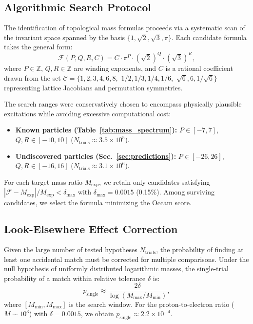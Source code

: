\documentclass[onecolumn,aps,prd,superscriptaddress,nofootinbib,amsmath,amssymb]{revtex4-2}
\begin{document}
\subsection{Algorithmic Search Protocol}
\label{subsec:search_protocol}

The identification of topological mass formulas proceeds via a systematic scan of the invariant space spanned by the basis $\{1, \sqrt{2}, \sqrt{3}, \pi\}$. Each candidate formula takes the general form:
\begin{equation}
    \mathcal{F}(P,Q,R,C) = C \cdot \pi^{P} \cdot (\sqrt{2})^{Q} \cdot (\sqrt{3})^{R},
    \label{eq:general_formula}
\end{equation}
where $P \in \mathbb{Z}$, $Q,R \in \mathbb{Z}$ are winding exponents, and $C$ is a rational coefficient drawn from the set $\mathcal{C} = \{1, 2, 3, 4, 6, 8,$ $1/2, 1/3, 1/4, 1/6,$ $\sqrt{6}, 6, 1/\sqrt{6}\}$ representing lattice Jacobians and permutation symmetries.

The search ranges were conservatively chosen to encompass physically plausible excitations while avoiding excessive computational cost:
\begin{itemize}
    \item \textbf{Known particles (Table~\ref{tab:mass_spectrum}):} $P \in [-7, 7]$, $Q,R \in [-10, 10]$ ($N_{\text{trials}} \approx 3.5 \times 10^5$).
    \item \textbf{Undiscovered particles (Sec.~\ref{sec:predictions}):} $P \in [-26, 26]$, $Q,R \in [-16, 16]$ ($N_{\text{trials}} \approx 3.1 \times 10^6$).
\end{itemize}
For each target mass ratio $M_{\text{exp}}$, we retain only candidates satisfying $|\mathcal{F} - M_{\text{exp}}|/M_{\text{exp}} < \delta_{\max}$ with $\delta_{\max} = 0.0015$ (0.15\%). Among surviving candidates, we select the formula minimizing the Occam score.

\subsection{Look-Elsewhere Effect Correction}
\label{subsec:lee_correction}

Given the large number of tested hypotheses $N_{\text{trials}}$, the probability of finding at least one accidental match must be corrected for multiple comparisons. Under the null hypothesis of uniformly distributed logarithmic masses, the single-trial probability of a match within relative tolerance $\delta$ is:
\begin{equation}
    p_{\text{single}} \approx \frac{2\delta}{\log(M_{\max}/M_{\min})},
    \label{eq:p_single}
\end{equation}
where $[M_{\min}, M_{\max}]$ is the search window. For the proton-to-electron ratio ($M \sim 10^3$) with $\delta = 0.0015$, we obtain $p_{\text{single}} \approx 2.2 \times 10^{-4}$.
\end{document}
